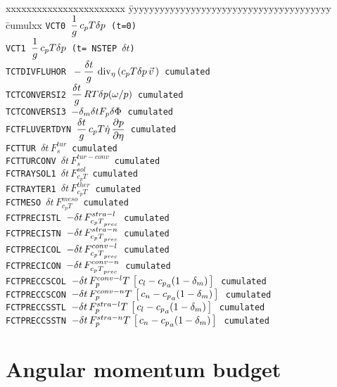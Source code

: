 \begin{tabbing}
xxxxxxxxxxxxxxxxxxxxxxx \= yyyyyyyyyyyyyyyyyyyyyyyyyyyyyyyyyyyyyyy \= cumulxx \kill
\tt VCT0 \> $\displaystyle\frac 1g \,c_pT \delta p$ (t=0) \\[1ex]
\tt VCT1 \> $\displaystyle\frac 1g \,c_pT \delta p$ (t= NSTEP $\delta t$) \\[1ex]
\tt TCTDIVFLUHOR \> $\ds\mb-\frac{\delta t}g \,\divi{\eta} \lp c_p T \delta p \,\vec v \,\rp$ \> cumulated\\[1ex]
\tt TCTCONVERSI2 \> $\displaystyle\frac{\delta t}g\,RT\delta p (\omega/p)$ \> cumulated\\[1ex]
\tt TCTCONVERSI3 \> $-\delta_m \delta t F_{p} \delta\Phi$ \> cumulated\\[1ex]
\tt FCTFLUVERTDYN \> $\displaystyle\frac{\delta t}g \,c_p T \dot\eta\,\frac{\displaystyle \partial p}{\displaystyle \partial \eta}$ \> cumulated\\[1ex]
\tt FCTTUR \> $\delta t \,F_s^{tur}$ \> cumulated\\
\tt FCTTURCONV \> $\delta t \,F_s^{tur-conv}$ \> cumulated\\
\tt FCTRAYSOL1 \> $\delta t \,F_{c_p T}^{sol}$ \> cumulated\\
\tt FCTRAYTER1 \> $\delta t \,F_{c_p T}^{ther}$ \> cumulated\\
\tt FCTMESO \> $\delta t \,F_{c_p T}^{meso}$ \> cumulated\\
\tt FCTPRECISTL \> $- \delta t \,F_{{c_p T}_{prec}}^{stra-l}{}$ \> cumulated\\
\tt FCTPRECISTN \> $- \delta t \,F_{{c_p T}_{prec}}^{stra-n}{}$ \> cumulated\\
\tt FCTPRECICOL \> $- \delta t \,F_{{c_p T}_{prec}}^{conv-l}{}$ \> cumulated\\
\tt FCTPRECICON \> $- \delta t \,F_{{c_p T}_{prec}}^{conv-n}{}$ \> cumulated\\
\tt FCTPRECCSCOL \> $- \delta t \,F_{p}^{conv-l} T \, \left[ \, c_l - {c_{p}}_{a} (1-\delta_m)\, \right] \,$ \> cumulated\\
\tt FCTPRECCSCON \> $- \delta t \,F_{p}^{conv-n} T \, \left[ \, c_n - {c_{p}}_{a} (1-\delta_m)\, \right] \,$ \> cumulated\\
\tt FCTPRECCSSTL \> $- \delta t \,F_{p}^{stra-l} T \, \left[ \, c_l - {c_{p}}_{a} (1-\delta_m)\, \right] \,$ \> cumulated\\
\tt FCTPRECCSSTN \> $- \delta t \,F_{p}^{stra-n} T \, \left[ \, c_n - {c_{p}}_{a} (1-\delta_m)\, \right] \,$ \> cumulated\\
\end{tabbing}

\section{Angular momentum budget}

